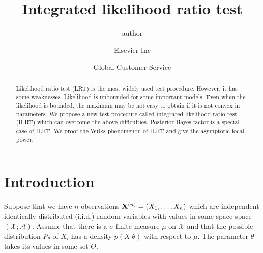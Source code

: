 \documentclass[3p]{elsarticle}
\theoremstyle{plain}
\theoremstyle{definition}
\theoremstyle{remark}
\begin{document}
\begin{frontmatter}

\title{Integrated likelihood ratio test}

\author{author }
\address{Radarweg 29, Amsterdam}

\author[mymainaddress,mysecondaryaddress]{Elsevier Inc}

\author[mysecondaryaddress]{Global Customer Service}

\address[mymainaddress]{1600 John F Kennedy Boulevard, Philadelphia}
\address[mysecondaryaddress]{360 Park Avenue South, New York}

\begin{abstract}

    Likelihood ratio test (LRT) is the most widely used test procedure. However, it has some weaknesses. Likelihood is unbounded for some important models. Even when the likelihood is bounded, the maximum may be not easy to obtain if it is not convex in parameters. We propose a new test procedure called integrated likelihood ratio test (ILRT) which can overcome the above difficulties. Posterior Bayes factor is a special case of ILRT\@. We proof the Wilks phenomenon of ILRT and give the asymptotic local power.
\end{abstract}

\begin{keyword}
\end{keyword}

\end{frontmatter}


\section{Introduction}
Suppose that we have $n$ observations $\mathbf{X}^{(n)}=(X_1,\ldots,X_n)$ which are independent identically distributed (i.i.d.) random variables with values in some space space $(\mathcal{X};\mathscr{A})$.
Assume that there is a $\sigma$-finite measure $\mu$ on $\mathcal{X}$ and that the  possible distribution $P_\theta$ of $X_i$ has a density $p(X|\theta)$ with respect to $\mu$. The parameter $\theta$ takes its values in some set $\Theta$.
\end{document}
